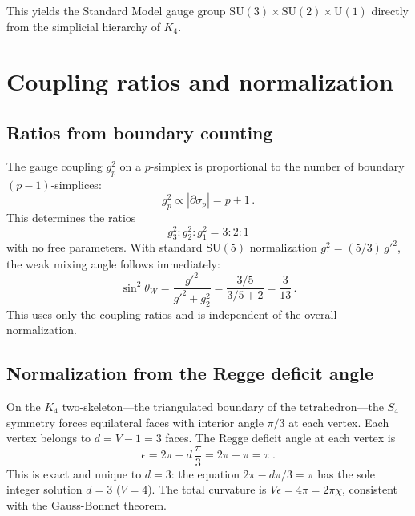 \documentclass[aip,graphicx]{revtex4-1}
\begin{document}
This yields the Standard Model gauge group
$\mathrm{SU}(3)\times\mathrm{SU}(2)\times\mathrm{U}(1)$ directly
from the simplicial hierarchy of $K_4$.


\section{Coupling ratios and normalization}
\label{sec:coupling}

\subsection{Ratios from boundary counting}

The gauge coupling $g_p^2$ on a $p$-simplex is proportional to the
number of boundary $(p-1)$-simplices:
\begin{equation}
g_p^2 \propto |\partial\sigma_p| = p + 1 \,.
\label{eq:ratios}
\end{equation}
This determines the ratios
\begin{equation}
g_3^2 : g_2^2 : g_1^2 = 3 : 2 : 1
\label{eq:321}
\end{equation}
with no free parameters. With standard $\mathrm{SU}(5)$
normalization $g_1^2 = (5/3)\,{g'}^2$,\cite{georgi1974} the weak
mixing angle follows immediately:
\begin{equation}
\sin^2\theta_W = \frac{g'^2}{g'^2 + g_2^2}
= \frac{3/5}{3/5 + 2} = \frac{3}{13} \,.
\label{eq:sin2}
\end{equation}
This uses only the coupling ratios and is independent of the overall
normalization.

\subsection{Normalization from the Regge deficit angle}

On the $K_4$ two-skeleton---the triangulated boundary of the
tetrahedron---the $S_4$ symmetry forces equilateral faces with
interior angle $\pi/3$ at each vertex. Each vertex belongs to
$d = V - 1 = 3$ faces. The Regge deficit angle at each vertex is
\begin{equation}
\epsilon = 2\pi - d\,\frac{\pi}{3} = 2\pi - \pi = \pi \,.
\label{eq:deficit}
\end{equation}
This is exact and unique to $d = 3$: the equation
$2\pi - d\pi/3 = \pi$ has the sole integer solution $d = 3$
($V = 4$). The total curvature is $V\epsilon = 4\pi = 2\pi\chi$,
consistent with the Gauss-Bonnet theorem.
\end{document}
